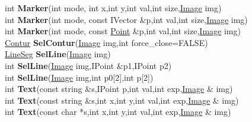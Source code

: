 \documentclass[10pt,titlepage]{article}
\def\functionlistentry#1#2#3#4#5#6{\noindent #1 {\bf #2}(#3) \dotfill #6\\}
\begin{document}
{{\functionlistentry{int}{Marker}{int mode, int x,int y,int val,int size,\hyperlink{Image}{Image} img}{1311}{graphics}{}
\functionlistentry{int}{Marker}{int mode, const IVector \&p,int val,int size,\hyperlink{Image}{Image} img}{1312}{graphics}{}
\functionlistentry{int}{Marker}{int mode, const \hyperlink{Point}{Point} \&p,int val,int size,\hyperlink{Image}{Image} img}{1313}{graphics}{}
\functionlistentry{\hyperlink{Contur}{Contur}}{SelContur}{\hyperlink{Image}{Image} img,int force\_close=FALSE}{1341}{graphics}{}
\functionlistentry{\hyperlink{LineSeg}{LineSeg}}{SelLine}{\hyperlink{Image}{Image} img}{1338}{graphics}{}
\functionlistentry{int}{SelLine}{\hyperlink{Image}{Image} img,IPoint \&p1,IPoint p2}{1339}{graphics}{}
\functionlistentry{int}{SelLine}{\hyperlink{Image}{Image} img,int p0[2],int p[2]}{1340}{graphics}{}
\functionlistentry{int}{Text}{const string \&s,IPoint p,int val,int exp,\hyperlink{Image}{Image} \& img}{1314}{graphics}{}
\functionlistentry{int}{Text}{const string \&s,int x,int y,int val,int exp,\hyperlink{Image}{Image} \& img}{1315}{graphics}{}
\functionlistentry{int}{Text}{const char *s,int x,int y,int val,int exp,\hyperlink{Image}{Image} \& img}{1316}{graphics}{}

}}
\end{document}
